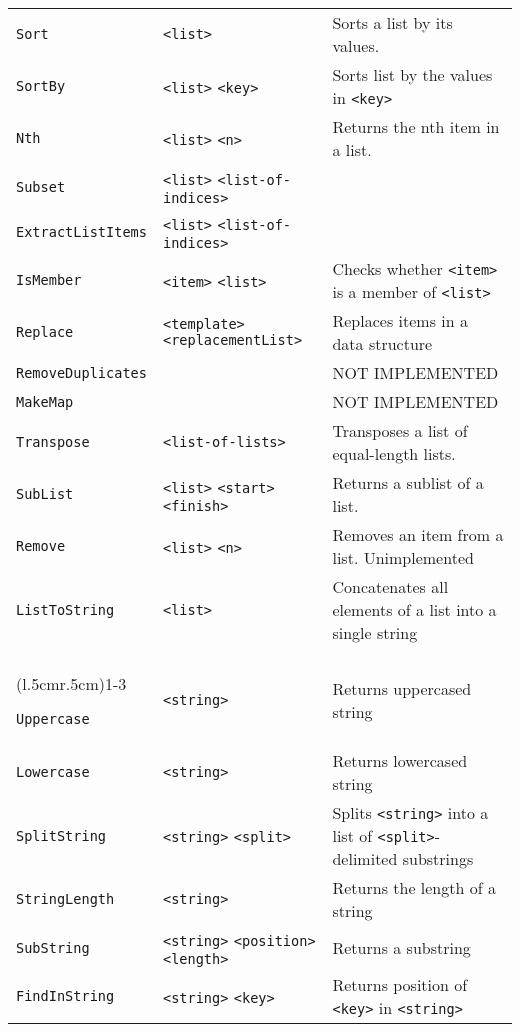 \begin{longtable}{p{3cm}p{3cm}p{6cm}}
\verb+Sort+ &\verb+<list>+ &Sorts a list by its values. \\ 
\verb+SortBy+ &\verb+<list>+ \verb+<key>+ & Sorts list by the values in \verb+<key>+ \\ 
\verb+Nth+ &\verb+<list>+ \verb+<n>+ &Returns the nth item in a list.\\ 
\verb+Subset+ &\verb+<list>+ \verb+<list-of-indices>+ & \\ 
\verb+ExtractListItems+ &\verb+<list>+ \verb+<list-of-indices>+ & \\ 
\verb+IsMember+ &\verb+<item>+ \verb+<list>+ & Checks whether \verb+<item>+ is a member of \verb+<list>+ \\ 
\verb+Replace+ &\verb+<template>+ \verb+<replacementList>+ & Replaces items in a data structure\\ 
\verb+RemoveDuplicates+ & & NOT IMPLEMENTED\\ 
\verb+MakeMap+ & & NOT IMPLEMENTED\\ 
\verb+Transpose+ &\verb+<list-of-lists>+ &Transposes a list of equal-length lists.\\ 
\verb+SubList+ &\verb+<list>+ \verb+<start>+ \verb+<finish>+ & Returns a sublist of a list.\\ 
\verb+Remove+ &\verb+<list>+ \verb+<n>+ & Removes an item from a list. Unimplemented\\ 
\verb+ListToString+ &\verb+<list>+ & Concatenates all elements of a list into a single string\\

\addlinespace[0.2cm] 
\midrule 
\multicolumn{3}{c}{\textbf{String Management Functions}}\\ 
\cmidrule(l{.5cm}r{.5cm}){1-3} 

\verb+Uppercase+ &\verb+<string>+ & Returns uppercased string\\ 
\verb+Lowercase+ &\verb+<string>+ & Returns lowercased string\\ 
\verb+SplitString+ &\verb+<string>+ \verb+<split>+ & Splits \verb+<string>+ into a list of 
\verb+<split>+-delimited substrings \\ 
\verb+StringLength+ &\verb+<string>+ & Returns the length of a string\\ 
\verb+SubString+ &\verb+<string>+ \verb+<position>+ \verb+<length>+& Returns a substring\\ 
\verb+FindInString+ &\verb+<string>+ \verb+<key>+ & Returns position of \verb+<key>+ in \verb+<string>+\\ 


\end{longtable} 


